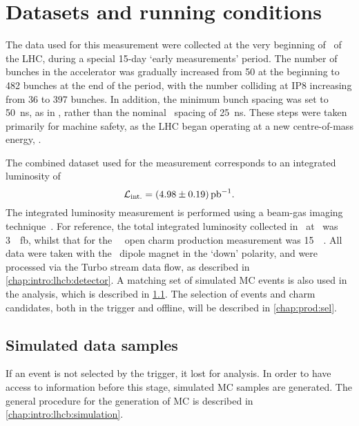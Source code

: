 \chapter{Datasets and running conditions}
\label{chap:prod:data}

The data used for this measurement were collected at the very beginning of 
\runtwo\ of the \ac{LHC}, during a special 15-day `early measurements' period.
The number of bunches in the accelerator was gradually increased from 50 at the 
beginning to 482 bunches at the end of the period, with the number colliding at 
IP8 increasing from 36 to 397 bunches.
In addition, the minimum bunch spacing was set to \SI{50}{\nano\second}, as in 
\runone, rather than the nominal \runtwo\ spacing of \SI{25}{\nano\second}.
These steps were taken primarily for machine safety, as the \ac{LHC} began 
operating at a new centre-of-mass energy, .

The combined dataset used for the measurement corresponds to an integrated 
luminosity of
\begin{equation}
  \intlumi = \SI{\xsectotlumi}{\per\pico\barn}.
  \label{eqn:prod:xsectotlumi}
\end{equation}
The integrated luminosity measurement is performed using a beam-gas imaging 
technique~\cite{LHCb-PAPER-2014-047}.
For reference, the total integrated luminosity collected in \runone\ at \lhcb\ 
was \SI{3}{\per\femto\barn}, whilst that for the \ \lhcb\ open charm 
production measurement was \SI{15}{\per\nb}.
All data were taken with the \lhcb\ dipole magnet in the `down' polarity, and 
were processed via the Turbo stream data flow, as described in 
\cref{chap:intro:lhcb:detector}.
A matching set of simulated \ac{MC} events is also used in the analysis, which 
is described in \cref{chap:prod:data:mc}.
The selection of events and charm candidates, both in the trigger and offline, 
will be described in \cref{chap:prod:sel}.

\section{Simulated data samples}
\label{chap:prod:data:mc}

If an event is not selected by the trigger, it lost for analysis.
In order to have access to information before this stage, simulated \acf{MC} 
samples are generated.
The general procedure for the generation of \ac{MC} is described in 
\cref{chap:intro:lhcb:simulation}.

